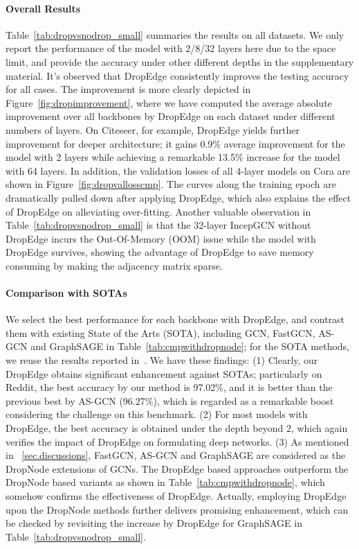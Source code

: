 \documentclass{article}
\begin{document}
\paragraph{Overall Results}
Table~\ref{tab:dropvsnodrop_small} summaries the results on all datasets. We only report the performance of the model with 2/8/32 layers here due to the space limit, and provide the accuracy under other different depths in the supplementary material.
It's observed that DropEdge consistently improves the testing accuracy for all cases. The improvement is more clearly depicted in Figure~\ref{fig:dropimprovement}, where we have computed the average absolute improvement over all backbones by DropEdge on each dataset under different numbers of layers. On Citeseer, for example,
DropEdge yields further improvement for deeper architecture; it gains 0.9\% average improvement for the model with 2 layers while achieving a remarkable 13.5\% increase for the model with 64 layers. In addition, the validation losses of all 4-layer models on Cora are shown in Figure~\ref{fig:dropvallosscmp}. The curves along the training epoch are dramatically pulled down after applying DropEdge, which also explains the effect of DropEdge on alleviating over-fitting.
Another valuable observation in Table~\ref{tab:dropvsnodrop_small} is that the 32-layer IncepGCN without DropEdge incurs the Out-Of-Memory (OOM) issue while the model with DropEdge survives, showing the advantage of DropEdge to save memory consuming by making the adjacency matrix sparse.



\paragraph{Comparison with SOTAs}
We select the best performance for each backbone with DropEdge, and contrast them with existing State of the Arts (SOTA), including GCN, FastGCN, AS-GCN and GraphSAGE in Table~\ref{tab:cmpwithdropnode}; for the SOTA methods, we reuse the results reported in~\citet{Huang2018}. We have these findings: (1) Clearly, our DropEdge obtains significant enhancement against SOTAs; particularly on Reddit, the best accuracy by our method is 97.02\%, and it is better than the previous best by AS-GCN (96.27\%), which is regarded as a remarkable boost considering the challenge on this benchmark.
(2) For most models with DropEdge, the best accuracy is obtained under the depth beyond 2, which again verifies the impact of DropEdge on formulating deep networks.
(3) As mentioned in \textsection~\ref{sec.discussions}, FastGCN, AS-GCN and GraphSAGE are considered as the DropNode extensions of GCNs. The DropEdge based approaches outperform the DropNode based variants as shown in Table~\ref{tab:cmpwithdropnode}, which somehow confirms the effectiveness of DropEdge. Actually, employing DropEdge upon the DropNode methods further delivers promising enhancement, which can be checked by revisiting the increase by DropEdge for GraphSAGE in Table~\ref{tab:dropvsnodrop_small}.
\end{document}
